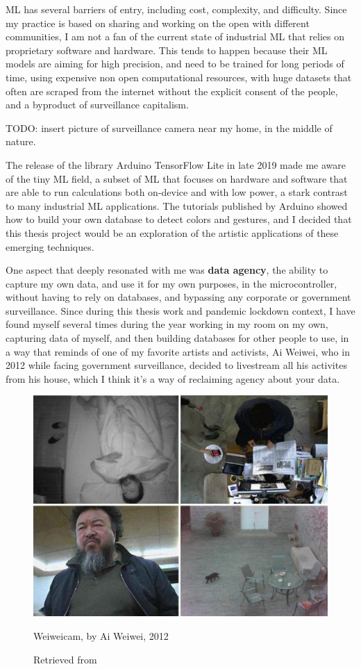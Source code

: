 \acrshort{ML} has several barriers of entry, including cost, complexity, and difficulty. Since my practice is based on sharing and working on the open with different communities, I am not a fan of the current state of industrial \acrshort{ML} that relies on proprietary software and hardware. This tends to happen because their ML models are aiming for high precision, and need to be trained for long periods of time, using expensive non open computational resources, with huge datasets that often are scraped from the internet without the explicit consent of the people, and a byproduct of surveillance capitalism.

TODO: insert picture of surveillance camera near my home, in the middle of nature.

The release of the library Arduino TensorFlow Lite in late 2019 made me aware of the tiny \acrshort{ML} field, a subset of \acrshort{ML} that focuses on hardware and software that are able to run calculations both on-device and with low power, a stark contrast to many industrial \acrshort{ML} applications. The tutorials published by Arduino showed how to build your own database to detect colors and gestures, and I decided that this thesis project would be an exploration of the artistic applications of these emerging techniques.

One aspect that deeply resonated with me was \textbf{data agency}, the ability to capture my own data, and use it for my own purposes, in the microcontroller, without having to rely on databases, and bypassing any corporate or government surveillance. Since during this thesis work and pandemic lockdown context, I have found myself several times during the year working in my room on my own, capturing data of myself, and then building databases for other people to use, in a way that reminds of one of my favorite artists and activists, Ai Weiwei, who in 2012 while facing government surveillance, decided to livestream all his activites from his house, which I think it's a way of reclaiming agency about your data. 

\begin{figure}[ht]
  \centering
  \includegraphics[width=0.75\linewidth,height=0.25\textheight,keepaspectratio]{images/weiweicam.jpg}
  \caption{Weiweicam, by Ai Weiwei, 2012}
  \caption*{Retrieved from \cite{website-forbes-ai-weiwei-cam}}
  \label{fig:weiweicam}
\end{figure}

